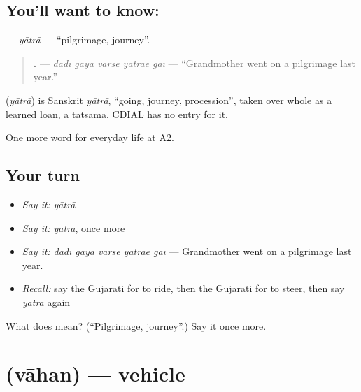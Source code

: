 \subsection*{You'll want to know: }
\textbf{} — \emph{yātrā} — \textquotedblleft{}pilgrimage, journey\textquotedblright{}.

\begin{quote}
\textbf{    .} — \emph{dādī gayā varse yātrāe gaī} — \textquotedblleft{}Grandmother went on a pilgrimage last year.\textquotedblright{}
\end{quote}

\begin{cousinweb}
\textbf{} (\emph{yātrā}) is Sanskrit \emph{yātrā}, \textquotedblleft{}going, journey, procession\textquotedblright{}, taken over whole as a learned loan, a tatsama. CDIAL has no entry for it.
\end{cousinweb}

\begin{grammarlens}[title={What you've built}]
One more word for everyday life at A2.
\end{grammarlens}

\subsection*{Your turn}
\begin{itemize}
\raggedright
  \item \emph{Say it:} \emph{yātrā}
  \item \emph{Say it:} \emph{yātrā}, once more
  \item \emph{Say it:} \emph{dādī gayā varse yātrāe gaī} — Grandmother went on a pilgrimage last year.
  \item \emph{Recall:} say the Gujarati for to ride, then the Gujarati for to steer, then say \emph{yātrā} again
\end{itemize}

\begin{tcolorbox}[breakable,colback=teal!4,colframe=teal!35!black,title={Before you move on}]
What does  mean? (\textquotedblleft{}Pilgrimage, journey\textquotedblright{}.) Say it once more.
\end{tcolorbox}
\section[\texorpdfstring{\gu{વાહન} (vāhan)}{વાહન (vāhan)}]{ (vāhan) — vehicle}

